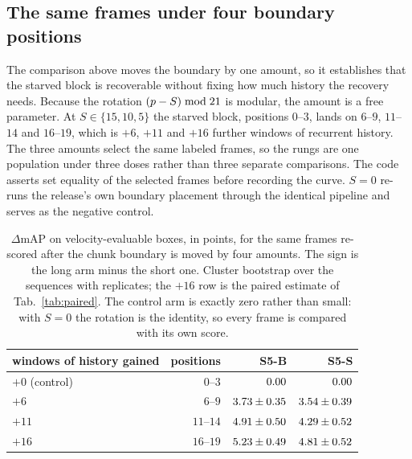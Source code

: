 \documentclass[10pt,twocolumn,letterpaper]{article}
\begin{document}
\subsection{The same frames under four boundary positions}
\label{sup:dose}

The comparison above moves the boundary by one amount, so it establishes that the starved
block is recoverable without fixing how much history the recovery needs. Because the
rotation $(p-S)\bmod21{}$ is modular, the amount is a free parameter. At
$S\in\{15,10,5\}$ the starved block, positions $0$--$3$, lands on $6$--$9$, $11$--$14$ and
$16$--$19$, which is $+6$, $+11$ and $+16$ further windows of recurrent history. The three
amounts select the same \ssmDoseN{} labeled frames, so the rungs are one population under
three doses rather than three separate comparisons. The code asserts set
equality of the selected frames before recording the curve. $S=0$ re-runs the release's own
boundary placement through the identical pipeline and serves as the negative control.

\begin{table}[h]
\centering\footnotesize
\setlength{\tabcolsep}{3.0pt}\renewcommand{\arraystretch}{0.95}
\begin{tabular}{lrrr}
\toprule
windows of history gained & positions & S5-B & S5-S \\
\midrule
$+0$ (control) & $0$--$3$ & $0.00$ & $0.00$ \\
$+6$ & $6$--$9$ & $3.73\pm0.35$ & $3.54\pm0.39$ \\
$+11$ & $11$--$14$ & $4.91\pm0.50$ & $4.29\pm0.52$ \\
$+16$ & $16$--$19$ & $5.23\pm0.49$ & $4.81\pm0.52$ \\
\bottomrule
\end{tabular}
\caption{$\Delta$mAP on velocity-evaluable boxes, in points, for the same \ssmDoseN{}
frames re-scored after the chunk boundary is moved by four amounts. The sign is the long
arm minus the short one. Cluster bootstrap over the \outSeqsScanned{} sequences with
\ssmPairedB{} replicates; the $+16$ row is the paired estimate of Tab.~\ref{tab:paired}.
The control arm is exactly zero rather than small: with $S=0$ the rotation is the identity,
so every frame is compared with its own score.}
\label{tab:dose}
\end{table}
\end{document}
